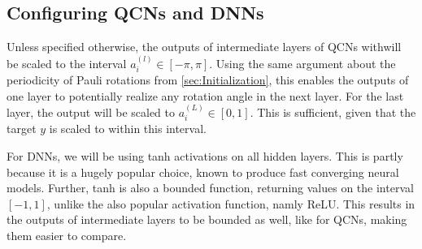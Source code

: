 \subsection{Configuring QCNs and DNNs}\label{sec:Configuring QCNs and DNNs}
Unless specified otherwise, the outputs of intermediate layers of QCNs withwill be scaled to the interval $a_i^{(l)} \in [-\pi, \pi]$. Using the same argument about the periodicity of Pauli rotations from \cref{sec:Initialization}, this enables the outputs of one layer to potentially realize any rotation angle in the next layer. For the last layer, the output will be scaled to $a_i^{(L)} \in [0, 1]$. This is sufficient, given that the target $y$ is scaled to within this interval. 

For DNNs, we will be using tanh activations on all hidden layers. This is partly because it is a hugely popular choice, known to produce fast converging neural models\cite{hands-on}. Further, tanh is also a bounded function, returning values on the interval $[-1, 1]$, unlike the also popular activation function, namly ReLU. This results in the outputs of intermediate layers to be bounded as well, like for QCNs, making them easier to compare.





















